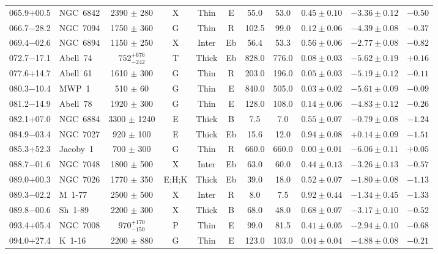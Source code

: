 \documentclass[useAMS]{mn2e}
\begin{document}
\begin{center}
{\begin{longtable}{llccccccccc}
065.9$+$00.5		&	NGC~6842	&	2390	$\pm$	280	&	X		&	Thin		&	E		&	55.0		&	53.0		&	$0.45 \pm 0.10$		&	$-3.36 \pm 0.12$		&	$-0.50$	\\
066.7$-$28.2		&	NGC~7094	&	1750	$\pm$	360	&	G		&	Thin		&	R		&	102.5		&	99.0		&	$0.12 \pm 0.06$		&	$-4.39 \pm 0.08$		&	$-0.37$	\\
069.4$-$02.6		&	NGC~6894	&	1150	$\pm$	250	&	X		&	Inter		&	Eb		&	56.4		&	53.3		&	$0.56 \pm 0.06$		&	$-2.77 \pm 0.08$		&	$-0.82$	\\
072.7$-$17.1		&	Abell~74	&	$752^{+676}_{-242}$		&	T		&	Thick		&	Eb		&	828.0		&	776.0		&	$0.08 \pm 0.03$		&	$-5.62 \pm 0.19$		&	$+0.16$	\\
077.6$+$14.7		&	Abell~61	&	1610	$\pm$	300	&	G		&	Thin		&	R		&	203.0		&	196.0		&	$0.05 \pm 0.03$		&	$-5.19 \pm 0.12$		&	$-0.11$	\\
080.3$-$10.4		&	MWP~1	&	510	$\pm$	60	&	G		&	Thin		&	E		&	840.0		&	505.0		&	$0.03 \pm 0.02$		&	$-5.61 \pm 0.09$		&	$-0.09$	\\
081.2$-$14.9		&	Abell~78	&	1920	$\pm$	300	&	G		&	Thin		&	E		&	128.0		&	108.0		&	$0.14 \pm 0.06$		&	$-4.83 \pm 0.12$		&	$-0.26$	\\
082.1$+$07.0		&	NGC~6884	&	3300	$\pm$	1240	&	E		&	Thick		&	B		&	7.5		&	7.0		&	$0.55 \pm 0.07$		&	$-0.79 \pm 0.08$		&	$-1.24$	\\
084.9$-$03.4		&	NGC~7027	&	920	$\pm$	100	&	E		&	Thick		&	Eb		&	15.6		&	12.0		&	$0.94 \pm 0.08$		&	$+0.14 \pm 0.09$		&	$-1.51$	\\
085.3$+$52.3		&	Jacoby~1	&	700	$\pm$	300	&	G		&	Thin		&	R		&	660.0		&	660.0		&	$0.00 \pm 0.01$		&	$-6.06 \pm 0.11$		&	$+0.05$	\\
088.7$-$01.6		&	NGC~7048	&	1800	$\pm$	500	&	X		&	Inter		&	Eb		&	63.0		&	60.0		&	$0.44 \pm 0.13$		&	$-3.26 \pm 0.13$		&	$-0.57$	\\
089.0$+$00.3		&	NGC~7026	&	1770	$\pm$	350	&	E;H;K		&	Thick		&	Eb		&	39.0		&	18.0		&	$0.52 \pm 0.07$		&	$-1.80 \pm 0.08$		&	$-1.13$	\\
089.3$-$02.2		&	M~1-77	&	2500	$\pm$	500	&	X		&	Inter		&	R		&	8.0		&	7.5		&	$0.92 \pm 0.44$		&	$-1.34 \pm 0.45$		&	$-1.33$	\\
089.8$-$00.6		&	Sh~1-89	&	2200	$\pm$	300	&	X		&	Thick		&	B		&	68.0		&	48.0		&	$0.68 \pm 0.07$		&	$-3.17 \pm 0.10$		&	$-0.52$	\\
093.4$+$05.4		&	NGC~7008	&	$970^{+170}_{-150}$		&	P		&	Thin		&	E		&	99.0		&	81.5		&	$0.41 \pm 0.05$		&	$-2.94 \pm 0.10$		&	$-0.68$	\\
094.0$+$27.4		&	K~1-16	&	2200	$\pm$	880	&	G		&	Thin		&	E		&	123.0		&	103.0		&	$0.04 \pm 0.04$		&	$-4.88 \pm 0.08$		&	$-0.21$	\\

\end{longtable}}
\end{center}
\end{document}
